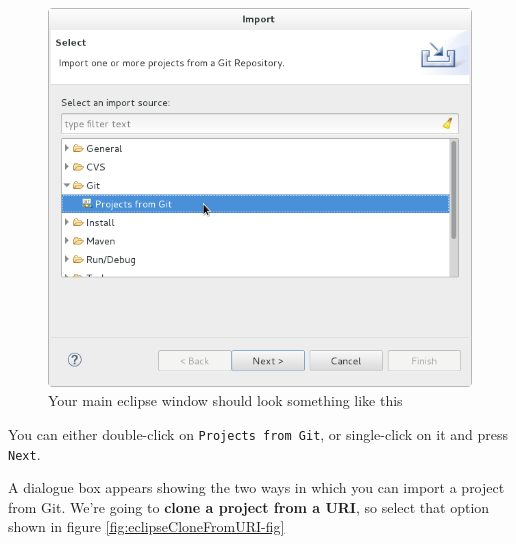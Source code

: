 \documentclass[
]{book}
\begin{document}
\begin{figure}

{\centering \includegraphics[width=1\linewidth]{images/1.4.eclipseImportProjectFromGit} 

}

\caption{Your main eclipse window should look something like this}\label{fig:eclipseImportProjectFromGit-fig}
\end{figure}

You can either double-click on \texttt{Projects\ from\ Git}, or single-click on it and press \texttt{Next}.

A dialogue box appears showing the two ways in which you can import a project from Git. We're going to \textbf{clone a project from a URI}, so select that option shown in figure \ref{fig:eclipseCloneFromURI-fig}
\end{document}
